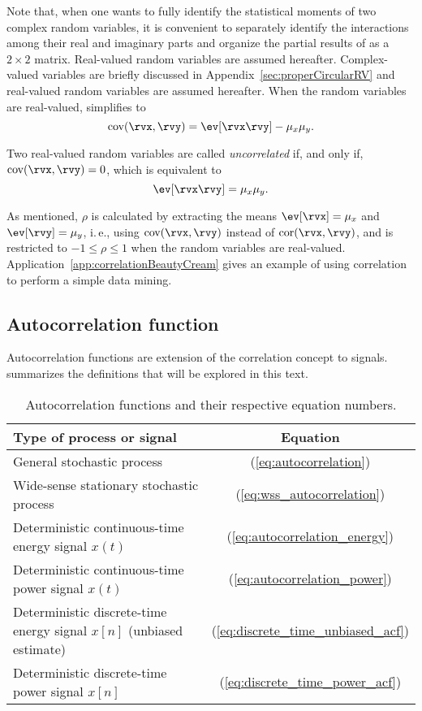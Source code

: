 Note that, when one wants to fully identify the statistical moments of two complex random variables, it is convenient to separately identify the interactions among their real and imaginary parts and organize the partial results of  as a $2 \times 2$ matrix. 
\ifml
Real-valued random variables are assumed hereafter.
\else
Complex-valued variables are briefly discussed in Appendix~\ref{sec:properCircularRV} and real-valued random variables are assumed hereafter.
\fi
When the random variables are real-valued, 
simplifies to
\[
\textrm{cov}(\rvx,\rvy) = \ev[\rvx \rvy] - \mu_x \mu_y.
\]

Two real-valued random variables are called \emph{uncorrelated} if, and only if, $\textrm{cov}(\rvx,\rvy) = 0$, which is equivalent to
\begin{equation}
\ev[\rvx \rvy] = \mu_x \mu_y.
\label{eq:uncorrelatedness}
\end{equation}

As mentioned, $\rho$ is calculated by extracting the means $\ev[\rvx]=\mu_x$ and $\ev[\rvy]=\mu_y$, i.\,e., using $\textrm{cov}(\rvx,\rvy)$ instead of $\textrm{cor}(\rvx,\rvy)$, and is restricted to $-1 \le \rho \le 1$ when the random variables are real-valued.
Application~\ref{app:correlationBeautyCream} gives an example of using correlation to perform a simple data mining.

\subsection{Autocorrelation function}
\label{sec:autocorrelationFunction}

Autocorrelation functions are extension of the correlation concept to signals.  summarizes the definitions that will be explored in this text.

\begin{table}
 \centering
 \caption{Autocorrelation functions and their respective equation numbers.\label{tab:acf_definitions}}
 \begin{tabularx}{\textwidth}{lc}
 \toprule
Type of process or signal & Equation \\ \midrule
General stochastic process & (\ref{eq:autocorrelation}) \\ 
Wide-sense stationary stochastic process & (\ref{eq:wss_autocorrelation}) \\ 
Deterministic continuous-time energy signal $x(t)$ & (\ref{eq:autocorrelation_energy}) \\ 
Deterministic continuous-time power signal $x(t)$ & (\ref{eq:autocorrelation_power}) \\ 
Deterministic discrete-time energy signal $x[n]$ (unbiased estimate) & (\ref{eq:discrete_time_unbiased_acf}) \\ 
Deterministic discrete-time power signal $x[n]$ & (\ref{eq:discrete_time_power_acf}) \\ \bottomrule
\end{tabularx}
\end{table}

